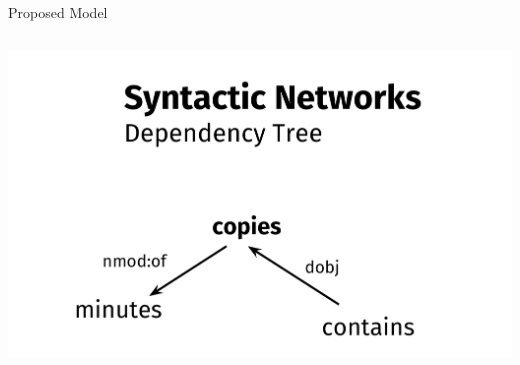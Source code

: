 \documentclass[10pt,=table]{beamer}
\begin{document}
\begin{frame}{Proposed Model}
\begin{columns}
\begin{minipage}[c][0.4\textheight][c]{\linewidth}
			 \centering
				 \includegraphics[width=1\linewidth]{image2/Chapitre2/deps_network_ex.pdf}
		\end{minipage}
	\end{columns}
	


\end{frame}
\end{document}
